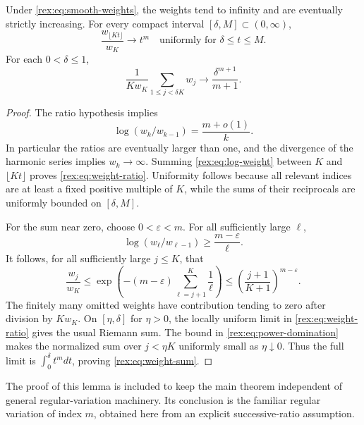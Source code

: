 \begin{lemma}\label{rex:lem:regular}
Under \cref{rex:eq:smooth-weights}, the weights tend to infinity and are
eventually strictly increasing. For every compact interval
$[\delta,M]\subset(0,\infty)$,
\begin{equation}\label{rex:eq:weight-ratio}
 \frac{w_{\lfloor Kt\rfloor}}{w_K}\longrightarrow t^m
 \quad\text{uniformly for }\delta\leq t\leq M.
\end{equation}
For each $0<\delta\leq1$,
\begin{equation}\label{rex:eq:weight-sum}
 \frac1{K w_K}\sum_{1\leq j<\delta K}w_j
 \longrightarrow\frac{\delta^{m+1}}{m+1}.
\end{equation}
\end{lemma}

\begin{proof}
The ratio hypothesis implies
\begin{equation}\label{rex:eq:log-weight}
 \log(w_k/w_{k-1})=\frac{m+o(1)}k.
\end{equation}
In particular the ratios are eventually larger than one, and the
divergence of the harmonic series implies $w_k\to\infty$.
Summing \cref{rex:eq:log-weight} between $K$ and $\lfloor Kt\rfloor$
proves \cref{rex:eq:weight-ratio}. Uniformity follows because all relevant
indices are at least a fixed positive multiple of $K$, while the sums
of their reciprocals are uniformly bounded on $[\delta,M]$.

For the sum near zero, choose $0<\varepsilon<m$. For all sufficiently
large $\ell$,
\[
 \log(w_\ell/w_{\ell-1})\geq\frac{m-\varepsilon}{\ell}.
\]
It follows, for all sufficiently large $j\leq K$, that
\begin{equation}\label{rex:eq:power-domination}
 \frac{w_j}{w_K}
 \leq\exp\!\left(-(m-\varepsilon)
                 \sum_{\ell=j+1}^{K}\frac1\ell\right)
 \leq\left(\frac{j+1}{K+1}\right)^{m-\varepsilon}.
\end{equation}
The finitely many omitted weights have contribution tending to zero
after division by $K w_K$. On $[\eta,\delta]$ for $\eta>0$, the
locally uniform limit in \cref{rex:eq:weight-ratio} gives the usual
Riemann sum. The bound in \cref{rex:eq:power-domination} makes the
normalized sum over $j<\eta K$ uniformly small as $\eta\downarrow0$.
Thus the full limit is $\int_0^\delta t^m dt$, proving
\cref{rex:eq:weight-sum}.
\end{proof}

The proof of this lemma is included to keep the main theorem independent
of general regular-variation machinery. Its conclusion is the familiar
regular variation of index $m$, obtained here from an explicit
successive-ratio assumption.

